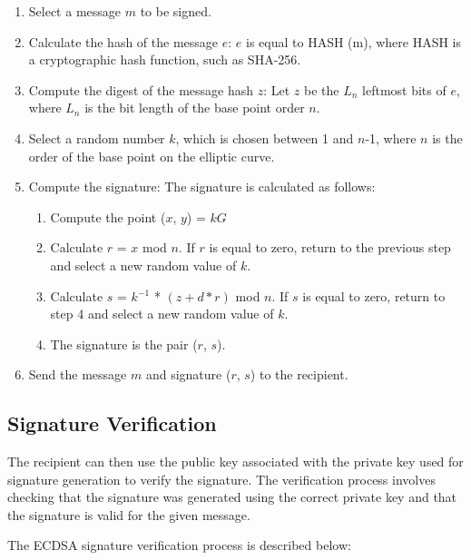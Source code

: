 \documentclass[main\_\_EN.tex]{subfiles}
\begin{document}
\begin{enumerate}
    \item Select a message $m$ to be signed.
    \item Calculate the hash of the message $e$: $e$ is equal to HASH (m), where HASH is a cryptographic hash function, such as SHA-256.
    \item Compute the digest of the message hash $z$: Let $z$ be the $L_n$ leftmost bits of $e$, where $L_n$ is the bit length of the base point order $n$.
    \item Select a random number $k$, which is chosen between 1 and $n$-1, where $n$ is the order of the base point on the elliptic curve.
    \item Compute the signature: The signature is calculated as follows:
          \begin{enumerate}
              \item Compute the point ($x$, $y$) = $kG$
              \item Calculate $r$ = $x$ mod $n$. If $r$ is equal to zero, return to the previous step and select a new random value of $k$.
              \item Calculate $s$ = $k$$^{-1}$ * $(z + d*r)$  \textrm{mod} $n$. If $s$ is equal to zero, return to step 4 and select a new random value of $k$.
              \item The signature is the pair ($r$, $s$).
          \end{enumerate}
    \item Send the message $m$ and signature ($r$, $s$) to the recipient.
\end{enumerate}

\subsection{Signature Verification}

The recipient can then use the public key associated with the private key used for signature generation to verify the signature. The verification process involves checking that the signature was generated using the correct private key and that the signature is valid for the given message.

The ECDSA signature verification process is described below:
\end{document}
